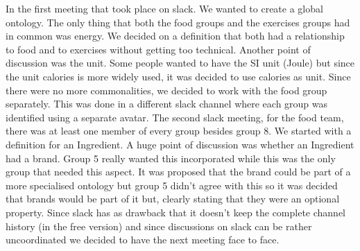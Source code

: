 In the first meeting that took place on slack. We wanted to create a global ontology. The only thing that both the food groups and the exercises groups had in common was energy. We decided on a definition that both had a relationship to food and to exercises without getting too technical. Another point of discussion was the unit. Some people wanted to have the SI unit (Joule) but since the unit calories is more widely used, it was decided to use calories as unit. Since there were no more commonalities, we decided to work with the food group separately. This was done in a different slack channel where each group was identified using a separate avatar. 
\newline
\newline
\noindent
The second slack meeting, for the food team, there was at least one member of every group besides group 8. We started with a definition for an Ingredient. A huge point of discussion was whether an Ingredient had a brand. Group 5 really wanted this incorporated while this was the only group that needed this aspect. It was proposed that the brand could be part of a more specialised ontology but group 5 didn't agree with this so it was decided that brands would be part of it but, clearly stating that they were an optional property. Since slack has as drawback that it doesn't keep the complete channel history (in the free version) and since discussions on slack can be rather uncoordinated we decided to have the next meeting face to face. 
\newline
\newline
\noindent
